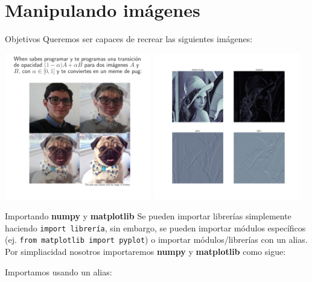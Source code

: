\documentclass[usenames,dvipsnames]{beamer}
\begin{document}
  \section{Manipulando imágenes}
  \begin{frame}{Objetivos}
    Queremos ser capaces de recrear las siguientes imágenes:
    \begin{center}
      \includegraphics[width=0.48\textwidth]{imgs/meme}\hspace{0.1cm}
      \includegraphics[width=0.48\textwidth]{imgs/derivatives}
    \end{center}
  \end{frame}

  \begin{frame}{Importando \textbf{numpy} y \textbf{matplotlib}}
    Se pueden importar librerías simplemente haciendo \texttt{import librería},
    sin embargo, se pueden importar módulos específicos (ej. \texttt{from
    matplotlib import pyplot}) o importar módulos/librerías con un alias.\\
    \vspace*{0.3cm}
    Por simpliacidad nosotros importaremos \textbf{numpy} y \textbf{matplotlib}
    como sigue:
    \vspace*{0.5cm}
    \begin{block}{Importamos usando un alias:}
      \\
      \\
      \vspace*{0.5cm}
    \end{block}
  \end{frame}
\end{document}
